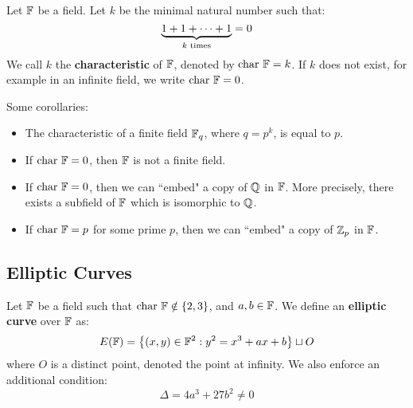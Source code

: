\documentclass{article}
\begin{document}

\begin{defn}
    Let $ \mathbb{F} $ be a field.
    Let $ k $ be the minimal natural number such that:
    \begin{equation*}
        \underbrace{1 + 1 + \dots + 1}_{k \textrm{ times}} = 0
    \end{equation*}
    We call $ k $ the \textbf{characteristic} of $ \mathbb{F} $, denoted by $ \operatorname{char\,}\mathbb{F} = k $. \vsp
    If $ k $ does not exist, for example in an infinite field, we write $ \operatorname{char\,}\mathbb{F} = 0 $.
\end{defn}

\begin{crll}
    Some corollaries:
    \begin{itemize}
        \item The characteristic of a finite field $ \mathbb{F}_{q} $,
    where $ q = p^{k} $, is equal to $ p $.
        \item If $ \operatorname{char\,}\mathbb{F} = 0 $, then $ \mathbb{F} $ is not a finite field.
        \item If $ \operatorname{char\,}\mathbb{F} = 0 $, then we can ``embed" a copy of $ \mathbb{Q} $ in $ \mathbb{F} $.
    More precisely, there exists a subfield of $ \mathbb{F} $ which is isomorphic to $ \mathbb{Q} $.
        \item If $ \operatorname{char\,}\mathbb{F} = p $ for some prime $ p $, then we can ``embed" a copy of
            $ \mathbb{Z}_{p} $ in $ \mathbb{F} $.
    \end{itemize}
\end{crll}

\newpage
\subsection{Elliptic Curves}

\begin{defn}
    Let $ \mathbb{F} $ be a field such that $ \operatorname{char\,}\mathbb{F} \notin \left\{{2, 3}\right\} $,
    and $ a, b \in \mathbb{F} $. We define an \textbf{elliptic curve} over $ \mathbb{F} $ as:
    \begin{equation*}
        E(\mathbb{F}) = \left\{{(x, y) \in \mathbb{F}^{2} : y^{2} = x^{3} + ax + b}\right\} \sqcup O
    \end{equation*}
    where $ O $ is a distinct point, denoted the point at infinity.
    We also enforce an additional condition:
    \begin{equation*}
        \Delta = 4a^{3} + 27b^{2} \neq 0
    \end{equation*}
\end{defn}
\end{document}
